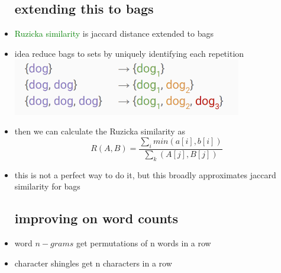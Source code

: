 \documentclass{article}
\begin{document}
\begin{itemize}
\subsection*{extending this to bags}
\item \textcolor{green}{Ruzicka similarity} is jaccard distance extended to bags
\item idea reduce bags to sets by uniquely identifying each repetition \\ \includegraphics*[width=10cm]{images/Screenshot 2023-05-11 at 1.51.05 AM.png}
\item then we can calculate the Ruzicka similarity as $$R(A,B)=\frac{\sum_{i}min(a[i], b[i])}{\sum_{k}(A[j], B[j])}$$
\item this is not a perfect way to do it, but this broadly approximates jaccard similarity for bags 
\subsection*{improving on word counts}
\item word $n-grams$ get permutations of n words in a row 
\item character shingles get n characters in a row 

\end{itemize}
\end{document}
